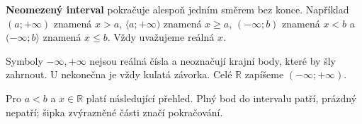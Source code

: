 \documentclass[11pt,a4paper]{article}
\begin{document}
\newpage
{}
\begin{definiceBox}[title={Definice - Neomezený interval}]
\textbf{Neomezený interval} pokračuje alespoň jedním směrem bez konce.
Například $(a;+\infty)$ znamená $x>a$, $\langle a;+\infty)$ znamená $x\ge a$,
$(-\infty;b)$ znamená $x<b$ a $(-\infty;b\rangle$ znamená $x\le b$.
Vždy uvažujeme reálná $x$.
\end{definiceBox}

Symboly $-\infty,+\infty$ nejsou reálná čísla a neoznačují krajní body,
které by šly zahrnout. U nekonečna je vždy kulatá závorka.
Celé $\mathbb R$ zapíšeme $(-\infty;+\infty)$.

Pro $a<b$ a $x\in\mathbb R$ platí následující přehled. Plný bod do
intervalu patří, prázdný nepatří; šipka zvýrazněné části značí pokračování.
\end{document}
